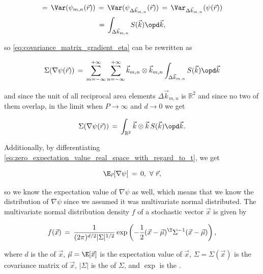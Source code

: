 \begin{equation}
\renewcommand*{\arraystretch}{2}
\begin{array}{c}
\displaystyle =\,\Var(\psi_{m,n}(\vec{r})) \,=\, \Var(\psi_{\Delta\vec{k}_{m,n}}(\vec{r})) \,=\, \Var_{\Delta\vec{k}_{m,n}}(\psi(\vec{r})) \\
\displaystyle =\, \int_{\Delta\vec{k}_{m,n}}S(\vec{k})\opd\vec{k},
\end{array}
\end{equation}

so \eqref{eq:covariance_matrix_gradient_eta} can be rewritten as

\begin{equation}
\Sigma(\nabla\psi(\vec{r})) \,=\, \sum_{m=-\infty}^{+\infty}\sum_{n=-\infty}^{+\infty}\vec{k}_{m,n}\otimes\vec{k}_{m,n} \int_{\Delta\vec{k}_{m,n}}S(\vec{k})\opd\vec{k}
\end{equation}

and since the unit of all reciprocal area elements $\Delta\vec{k}_{m,n}$ is $\mathbb{R}^2$ and since no two of them overlap, in the limit when $P\to\infty$ and $d\to 0$ we get

\begin{equation} \label{eq:covariance_matrix_gradient_eta_final}
\Sigma(\nabla\psi(\vec{r})) \,=\, \int_{\mathbb{R}^2}\vec{k}\otimes\vec{k}\,S(\vec{k})\opd\vec{k}.
\end{equation}

Additionally, by differentiating \eqref{eq:zero_expectation_value_real_space_with_regard_to_t}, we get

\begin{equation} \label{eq:psi_of_r_expectation_value}
\E_{\vec{r}}[\nabla\psi] \,=\, 0,\ \forall\ \vec{r},
\end{equation}

so we know the expectation value of $\nabla\psi$ as well, which means that we know the distribution of $\nabla\psi$ since we assumed it was multivariate normal distributed. The multivariate normal distribution density $f$ of a stochastic vector $\vec{x}$ is given by

\begin{equation} \label{eq:multivariate_normal_distribution_density}
f(\vec{x}) \,=\, \frac{1}{(2\pi)^{d/2}|\Sigma|^{1/2}}\exp\left(-\frac{1}{2}(\vec{x}-\vec{\mu})^{\T}\Sigma^{-1}(\vec{x}-\vec{\mu})\right),
\end{equation}

where $d$ is the \dimensionality of $\vec{x}$, $\vec{\mu} = \E[\vec{x}]$ is the expectation value of $\vec{x}$, $\Sigma = \Sigma(\vec{x})$ is the covariance matrix of $\vec{x}$, $|\Sigma|$ is the \determinant of $\Sigma$, and $\exp$ is the .

